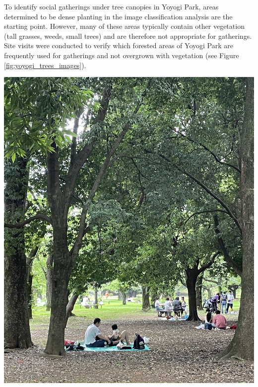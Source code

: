 \begin{multicols}{2}
To identify social gatherings under tree canopies in Yoyogi Park, areas determined to be dense planting in the image classification analysis are the starting point. However, many of these areas typically contain other vegetation (tall grasses, weeds, small trees) and are therefore not appropriate for gatherings. Site visits were conducted to verify which forested areas of Yoyogi Park are frequently used for gatherings and not overgrown with vegetation (see Figure \ref{fig:yoyogi_trees_images}). 
\begin{minipage}{0.43\textwidth}
    \centering
    \includegraphics[width=\linewidth]{images/gatherings/yoyogi_trees_image1.jpeg}\par\hspace{0.5pt}

\end{minipage}
\end{multicols}

